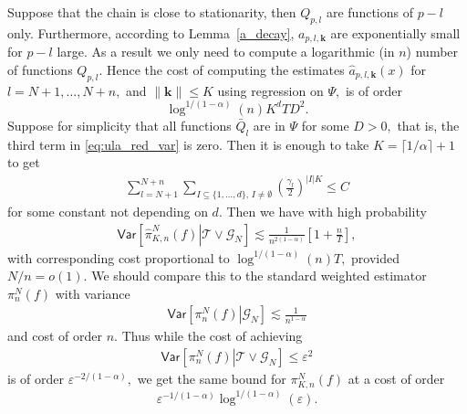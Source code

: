 \documentclass[aap,preprint]{imsart}
\def\NtrainPath{T}
\def\TrainSet{\mathcal{T}}
\begin{document}
Suppose that the chain is close to stationarity, then \(Q_{p,l}\) are functions of \(p-l\) only.
Furthermore,  according to Lemma~\ref{a_decay}, \(a_{p,l,\mathbf{k}}\) are exponentially small for \(p-l\) large.
As a result we only need to compute a logarithmic (in \(n\)) number of functions \(Q_{p,l}.\)
Hence the cost of computing the estimates  \(\widehat {a}_{p,l,\mathbf{k}}(x)\) for \(l=N+1,\ldots,N+n,\) and \(\|\mathbf{k}\|\leq K\) using regression on \(\Psi,\) is of order
\[
\log^{1/(1-\alpha)} (n) K^d  \NtrainPath D^2.
\]
Suppose for simplicity that all functions \(\bar{Q}_l\) are in \(\Psi\) for some \(D>0,\) that is, the third term in \eqref{eq:ula_red_var} is zero.  Then it is enough to take \(K=\lceil 1/\alpha \rceil+1\) to get
\begin{eqnarray*}
\sum_{l=N+1}^{N+n}\sum_{I\subseteq\{1,\ldots,d\},\, I\neq \emptyset}
\left(\frac{\gamma_{l}}{2}\right)^{|I|K}\leq C
\end{eqnarray*}
for some constant not depending on \(d.\) Then we have with high probability
\begin{eqnarray*}
\mathsf{Var}\left[\left.\widehat \pi_{K,n}^N(f)\right | \TrainSet \vee \mathcal{G}_N\right]\lesssim \frac{1}{n^{2(1-\alpha)}}\left[1+\frac{n}{\NtrainPath}\right],
\end{eqnarray*}
with corresponding cost proportional to \(\log^{1/(1-\alpha)} (n) \NtrainPath,\) provided \(N/n=o(1).\) We should compare this to the standard weighted estimator \(\pi_{n}^N(f)\) with variance
\begin{eqnarray*}
\mathsf{Var}\left[\left. \pi_{n}^N(f)\right |  \mathcal{G}_N\right]\lesssim \frac{1}{n^{1-\alpha}}
\end{eqnarray*}
and cost of order \(n.\) Thus while the cost of achieving
\begin{eqnarray*}
\mathsf{Var}\left[\left. \pi_{n}^N(f)\right | \TrainSet \vee \mathcal{G}_N\right]\leq \varepsilon^2
\end{eqnarray*}
is of order  \(\varepsilon^{-2/(1-\alpha)},\) we get the same bound for \(\pi_{K,n}^N(f)\) at a cost of order
\[
\varepsilon^{-1/(1-\alpha)}\log^{1/(1-\alpha)} (\varepsilon).
\]
\end{document}

